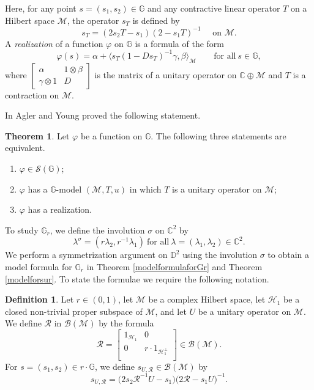 \documentclass[12pt,reqno]{amsart}
\numberwithin{equation}{section}
\renewcommand\phi{\varphi}
\def\d{\mathbb{D}}
\def\c{\mathbb{C}}
\newcommand\inv{^{-1}}
\newcommand\bbm{\begin{bmatrix}}
\newcommand\ebm{\end{bmatrix}}
\def\m{\mathcal{M}}
\def\ph{\phi}
\newcommand\calm{\mathcal{M}}
\newcommand\ess{\mathcal{S}}
\def\be{\begin{equation}}
\def\ee{\end{equation}}
\def\ip#1#2{\langle #1,#2\rangle}
\theoremstyle{definition}
\newtheorem{defin}[equation]{Definition}
\newtheorem{thm}[equation]{Theorem}
\begin{document}
Here, for any point $s=(s_1,s_2)\in \mathbb{G}$ and any contractive linear operator $T$ on a Hilbert space $\calm$, the operator $s_T$ is defined by
\begin{equation}\label{defsU}
s_T=(2s_2T-s_1)(2-s_1T)\inv \quad \mbox{ on } \calm.
\end{equation}
A {\em realization} of a function $\ph$ on $\mathbb{G}$ is a formula of the form
\be\label{realize-2}
\ph(s) =\alpha + \ip{s_T(1-D s_T)\inv \gamma}{\beta}_\m\qquad  \text{for all} \ s \in \mathbb{G},
\ee
where $\bbm \alpha & 1\otimes \beta\\ \gamma\otimes 1 & D\ebm$ is the matrix of a  unitary operator on $\c\oplus \m$ and $T$ is a contraction on $\calm$.

In \cite[Theorem 2.2 and Theorem 3.1]{AY17} Agler and Young proved the following statement.
\begin{thm}\label{modelGthm}
Let $\ph$ be a function on $\mathbb{G}$.  The following three statements are equivalent.
\begin{enumerate}
\item   $\ph\in\ess(\mathbb{G})$;
\item $\ph$ has a $\mathbb{G}$-model $(\calm, T, u)$ in which $T$ is a unitary operator on $\calm$;
\item $\ph$ has a realization.
\end{enumerate}
\end{thm}
To study $\mathbb{G}_{r}$, we define the involution $\sigma$ on $\mathbb{C}^{2}$ by 
\begin{equation}\label{invol-sigma-intro}
 \lambda^{\sigma} = (r\lambda_{2},r^{-1}\lambda_{1})~ \text{for all}~ \lambda= (\lambda_1, \lambda_2) \in \mathbb{C}^{2}.
\end{equation}
We perform  a symmetrization argument on $\d^2$ using the involution $\sigma$
to obtain a model formula for $\mathbb{G}_{r}$ in Theorem \ref{modelformulaforGr} and Theorem \ref{modelforsur}. To state the formulae we require the following notation.

\begin{defin}\label{sUR-def-intro}
Let $r\in(0,1)$, let $\mathcal{M}$ be a complex Hilbert space, let $\mathcal{H}_{1}$ be a closed non-trivial proper subspace of $\mathcal{M}$,  and let $U$ be a unitary operator on $\mathcal{M}$.  We define $\mathcal{R}$ in $\mathcal{B(M)}$ by the formula 
\begin{equation} \label{RonM-intro}
\mathcal{R}=\begin{bmatrix}
	1_{\mathcal{H}_{1}  } 	& 0                \\
	0 		& r\cdot 1_{\mathcal{H}_{1}^{\perp}}  	\\
\end{bmatrix}\in\mathcal{B(M)}.
\end{equation}
For $s=(s_{1},s_{2})\in r\cdot\mathbb{G}$, we define $s_{U,\mathcal{R}}\in\mathcal{B(M)}$  by
\begin{equation}\label{sUR-form-intro}
s_{U,\mathcal{R}} = \bigg(2s_{2}\mathcal{R}^{-1}U-s_{1}\bigg)\bigg(2\mathcal{R}-s_{1}U\bigg)^{-1}.
\end{equation}
\end{defin}
\end{document}
